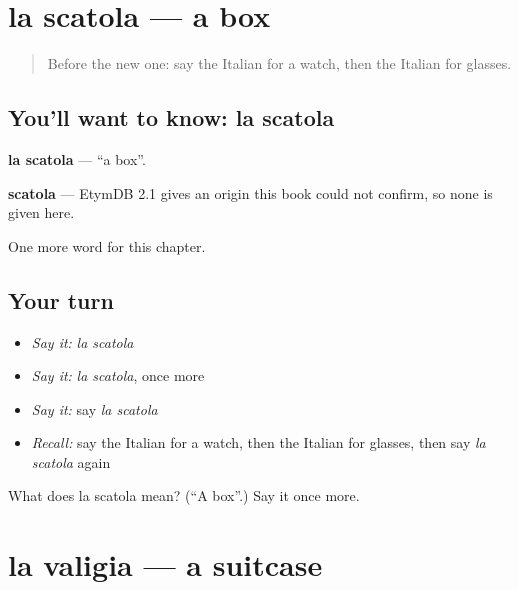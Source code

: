 \section[la scatola]{la scatola — a box}

\label{lesson:IT-C63-scatola}



\begin{quote}
Before the new one: say the Italian for a watch, then the Italian for glasses.
\end{quote}

\subsection*{You'll want to know: la scatola}
\textbf{la scatola} — \textquotedblleft{}a box\textquotedblright{}.

\begin{cousinweb}
\textbf{scatola} — EtymDB 2.1 gives an origin this book could not confirm, so none is given here.
\end{cousinweb}

\begin{grammarlens}[title={What you've built}]
One more word for this chapter.
\end{grammarlens}

\subsection*{Your turn}
\begin{itemize}
\raggedright
  \item \emph{Say it:} \emph{la scatola}
  \item \emph{Say it:} \emph{la scatola}, once more
  \item \emph{Say it:} say \emph{la scatola}
  \item \emph{Recall:} say the Italian for a watch, then the Italian for glasses, then say \emph{la scatola} again
\end{itemize}

\begin{tcolorbox}[breakable,colback=teal!4,colframe=teal!35!black,title={Before you move on}]
What does la scatola mean? (\textquotedblleft{}A box\textquotedblright{}.) Say it once more.
\end{tcolorbox}
\section[la valigia]{la valigia — a suitcase}

